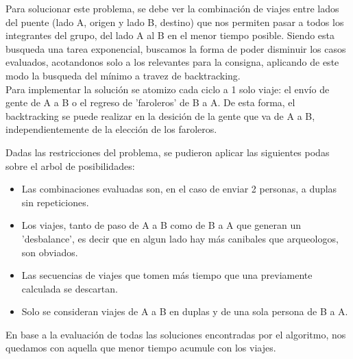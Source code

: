 Para solucionar este problema, se debe ver la combinaci\'on de viajes entre lados del puente (lado A, origen y lado B, destino) que nos permiten pasar a todos los integrantes
del grupo, del lado A al B en el menor tiempo posible. Siendo esta busqueda una tarea exponencial, buscamos la forma de poder disminuir los casos evaluados, acotandonos solo a los relevantes
para la consigna, aplicando de este modo la busqueda del m\'inimo a travez de backtracking.\\

Para implementar la solución se atomizo cada ciclo a 1 solo viaje: el env\'io de gente de A a B o el regreso de 'faroleros' de B a A. De esta forma, el backtracking se puede realizar en 
la desición de la gente que va de A a B, independientemente de la elección de los faroleros.

Dadas las restricciones del problema, se pudieron aplicar las siguientes podas sobre el arbol de posibilidades:
\begin{itemize}
	\item Las combinaciones evaluadas son, en el caso de enviar 2 personas, a duplas sin repeticiones.
	\item Los viajes, tanto de paso de A a B como de B a A que generan un 'desbalance', es decir que en algun lado hay más canibales que arqueologos, son obviados.
	\item Las secuencias de viajes que tomen más tiempo que una previamente calculada se descartan.
	\item Solo se consideran viajes de A a B en duplas y de una sola persona de B a A.
\end{itemize}

En base a la evaluación de todas las soluciones encontradas por el algoritmo, nos quedamos con aquella que menor tiempo acumule con los viajes.